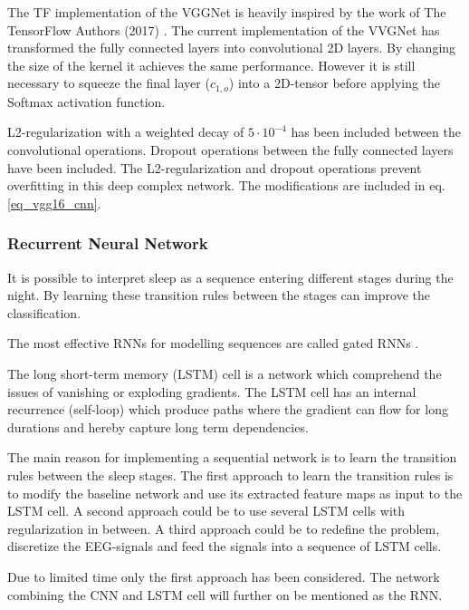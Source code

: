The TF implementation of the VGGNet is heavily inspired by the work of The TensorFlow Authors (2017) \cite{git_vgg16}. 
The current implementation of the VVGNet has transformed the fully connected layers into convolutional 2D layers. By changing the size of the kernel it achieves the same performance. However it is still necessary to squeeze the final layer ($c_{1,o}$) into a 2D-tensor before applying the Softmax activation function.

L2-regularization with a weighted decay of $5 \cdot 10^{-4}$ has been included between the convolutional operations. Dropout operations between the fully connected layers have been included.
The L2-regularization and dropout operations prevent overfitting in this deep complex network. The modifications are included in eq. \ref{eq_vgg16_cnn}.
  


\subsubsection{Recurrent Neural Network}
It is possible to interpret sleep as a sequence entering different stages during the night. By learning these transition rules between the stages can improve the classification.

The most effective RNNs for modelling sequences are called gated RNNs \cite[sec. 10.10]{dl_book}. 

The long short-term memory (LSTM) cell is a network which comprehend the issues of vanishing or exploding gradients. The LSTM cell has an internal recurrence (self-loop) which produce paths where the gradient can flow for long durations and hereby capture long term dependencies.  

The main reason for implementing a sequential network is to learn the transition rules between the sleep stages.
The first approach to learn the transition rules is to modify the baseline network and use its extracted feature maps as input to the LSTM cell. A second approach could be to use several LSTM cells with regularization in between. A third approach could be to redefine the problem, discretize the EEG-signals and feed the signals into a sequence of LSTM cells.

Due to limited time only the first approach has been considered. The network combining the CNN and LSTM cell will further on be mentioned as the RNN.


